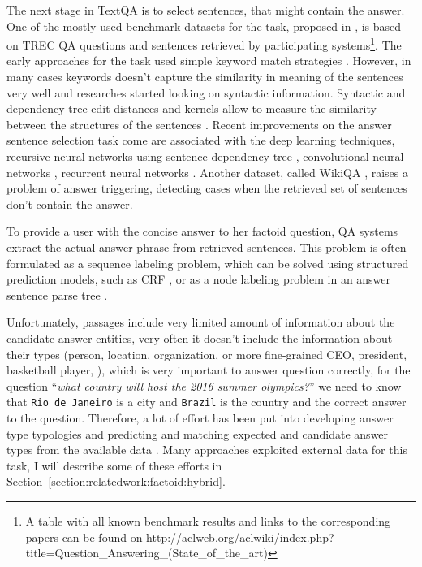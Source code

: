 The next stage in TextQA is to select sentences, that might contain the answer.
One of the mostly used benchmark datasets for the task, proposed in \cite{wang2007jeopardy}, is based on TREC QA questions and sentences retrieved by participating systems\footnote{A table with all known benchmark results and links to the corresponding papers can be found on http://aclweb.org/aclwiki/index.php?title=Question\_Answering\_(State\_of\_the\_art)}.
The early approaches for the task used simple keyword match strategies \cite{ittycheriah2001ibm,soubbotin2001patterns}.
However, in many cases keywords doesn't capture the similarity in meaning of the sentences very well and researches started looking on syntactic information.
Syntactic and dependency tree edit distances and kernels allow to measure the similarity between the structures of the sentences \cite{punyakanok2004mapping,shen2005exploring,heilman2010tree,yao2013answer,wang2010probabilistic}.
Recent improvements on the answer sentence selection task come are associated with the deep learning techniques, \eg recursive neural networks using sentence dependency tree \cite{iyyer2014neural}, convolutional neural networks \cite{yu2014deep,santos2016attentive}, recurrent neural networks \cite{tan2015lstm,WangN15}.
Another dataset, called WikiQA \cite{yang2015wikiqa}, raises a problem of answer triggering, \ie detecting cases when the retrieved set of sentences don't contain the answer.

To provide a user with the concise answer to her factoid question, QA systems extract the actual answer phrase from retrieved sentences.
This problem is often formulated as a sequence labeling problem, which can be solved using structured prediction models, such as CRF \cite{yao2013answer}, or as a node labeling problem in an answer sentence parse tree \cite{malon2013answer}.

Unfortunately, passages include very limited amount of information about the candidate answer entities, \ie very often it doesn't include the information about their types (person, location, organization, or more fine-grained CEO, president, basketball player, \etc), which is very important to answer question correctly, \eg for the question ``\textit{what country will host the 2016 summer olympics?}'' we need to know that \texttt{Rio de Janeiro} is a city and \texttt{Brazil} is the country and the correct answer to the question.
Therefore, a lot of effort has been put into developing answer type typologies \cite{hovy2000question,Hovy:2002:QTS:1289189.1289206} and predicting and matching expected and candidate answer types from the available data \cite{LiRoth02,li2006learning, prager2006question}.
Many approaches exploited external data for this task, I will describe some of these efforts in Section~\ref{section:relatedwork:factoid:hybrid}.

